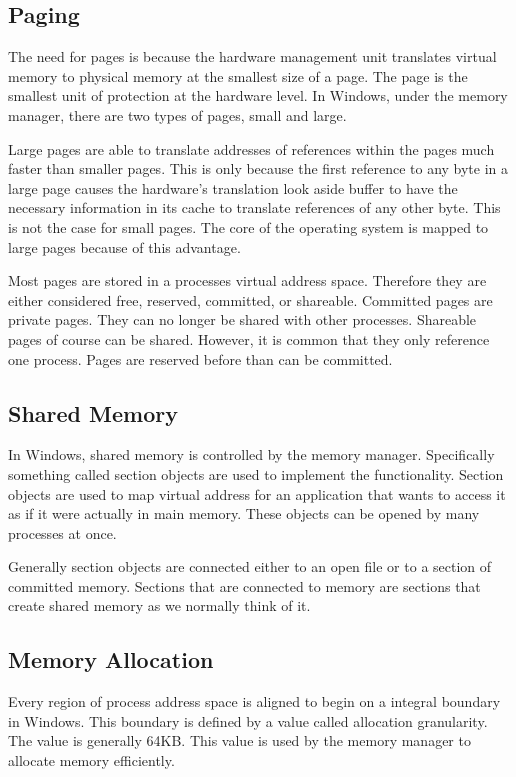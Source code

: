 \documentclass[letterpaper,10pt,titlepage,draftclsnofoot,onecolumn]{IEEEtran}
\begin{document}
\subsection{Paging}
The need for pages is because the hardware management unit translates virtual memory to physical memory at the smallest size of a page. The  page is the smallest  unit of protection at the hardware level. In Windows, under the memory manager, there are two types of pages, small and large. 

Large pages are able to translate addresses of references within the pages much faster than smaller pages. This is only because the first reference to any byte in a large page causes the hardware's translation look aside buffer to have the necessary information in its cache to translate references of any other byte. This is not the case for small pages. The core of the operating system is mapped to large pages because of this advantage.

Most pages are stored in a processes virtual address space. Therefore they are either considered free, reserved, committed, or shareable. Committed pages are private pages. They can no longer be shared with other processes. Shareable pages of course can be shared. However, it is common that they only reference one process. Pages are reserved before than can be committed. \cite{windows}

\subsection{Shared Memory}
In Windows, shared memory  is controlled by the memory manager. Specifically something called section objects are used to implement the functionality. Section objects are used to map virtual address for an application that wants to access it as if it were actually in main memory. \cite{windows} These objects can be opened by many processes at once. 

Generally section objects are connected either to an open file or to a section of committed memory. Sections that are connected to memory are sections that create shared memory as we normally think of it. 

\subsection{Memory Allocation}
Every region of process address space is aligned to begin on a integral boundary in Windows. This boundary is defined by a value called allocation granularity. \cite{windows} The value is generally 64KB. This value is used by the memory manager to allocate memory efficiently. 
\end{document}
